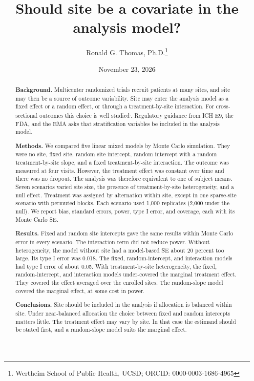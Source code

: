 \documentclass[
  11pt,
]{article}
\title{Should site be a covariate in the analysis model?}
\author{Ronald G. Thomas, Ph.D.\thanks{Wertheim School of Public Health, UCSD; ORCID: 0000-0003-1686-4965}}
\date{November 23, 2026}
\begin{document}
\maketitle
\begin{abstract}
\textbf{Background.} Multicenter randomized trials recruit patients at
many sites, and site may then be a source of outcome variability.
Site may enter the analysis model as a fixed effect or a random
effect, or through a treatment-by-site interaction. For
cross-sectional outcomes this choice is well studied\textsuperscript{,}. Regulatory guidance from
ICH E9, the FDA, and the EMA asks that stratification variables be
included in the analysis model.

\textbf{Methods.} We compared five linear mixed models by Monte Carlo
simulation. They were no site, fixed site, random site intercept,
random intercept with a random treatment-by-site slope, and a
fixed treatment-by-site interaction. The outcome was measured at
four visits. However, the treatment effect was constant over time
and there was no dropout. The analysis was therefore equivalent to
one of subject means. Seven scenarios varied site size, the
presence of treatment-by-site heterogeneity, and a null effect.
Treatment was assigned by alternation within site, except in one
sparse-site scenario with permuted blocks. Each scenario used 1,000
replicates (2,000 under the null). We report bias, standard
errors, power, type I error, and coverage, each with its Monte
Carlo SE.

\textbf{Results.} Fixed and random site intercepts gave the same
results within Monte Carlo error in every scenario. The
interaction term did not reduce power. Without heterogeneity, the
model without site had a model-based SE about 20 percent too large.
Its type I error was 0.018. The fixed, random-intercept, and
interaction models had type I error of about 0.05. With
treatment-by-site heterogeneity, the fixed, random-intercept, and
interaction models under-covered the marginal treatment effect.
They covered the effect averaged over the enrolled sites. The
random-slope model covered the marginal effect, at some cost in
power.

\textbf{Conclusions.} Site should be included in the analysis if
allocation is balanced within site. Under near-balanced allocation
the choice between fixed and random intercepts matters little. The
treatment effect may vary by site. In that case the estimand should
be stated first, and a random-slope model suits the marginal effect.
\end{abstract}
\end{document}
